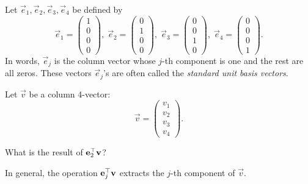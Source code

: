 \documentclass{ximera}
\author{Tae Eun Kim}
\begin{document}
\begin{exercise}
  Let $\vec{e}_1, \vec{e}_2, \vec{e}_3, \vec{e}_4$ be defined by
  \[
    \vec{e}_1 =
    \begin{pmatrix}
      1\\ 0\\ 0\\ 0
    \end{pmatrix},\;
    \vec{e}_2 =
    \begin{pmatrix}
      0\\ 1\\ 0\\ 0
    \end{pmatrix},\;
    \vec{e}_3 =
    \begin{pmatrix}
      0\\ 0\\ 1\\ 0
    \end{pmatrix},\;
    \vec{e}_4 =
    \begin{pmatrix}
      0\\ 0\\ 0\\ 1
    \end{pmatrix}.
  \]
  In words, $\vec{e}_j$ is the column vector whose $j$-th component is
  one and the rest are all zeros. These vectors $\vec{e}_j$'s are often
  called the \textit{standard unit basis vectors}.

  Let $\vec{v}$ be a column 4-vector:
  \[
    \vec{v} =
    \begin{pmatrix}
      v_1 \\ v_2 \\ v_3 \\ v_4
    \end{pmatrix}.
  \]

  What is the result of $\mathbf{e}_2^\top \mathbf{v}$?
  \begin{multipleChoice}
  \end{multipleChoice}
  \begin{feedback}[correct]
    In general, the operation $\mathbf{e}_j^\top \mathbf{v}$ extracts
    the $j$-th component of $\vec{v}$.
  \end{feedback}


\end{exercise}
\end{document}
